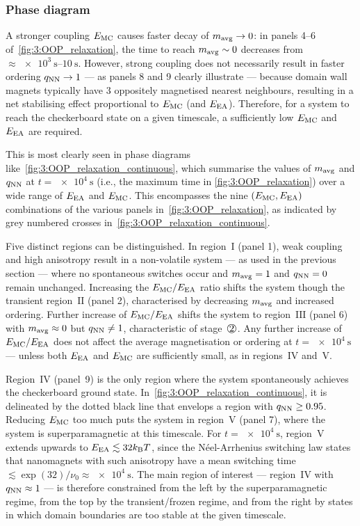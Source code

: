 \subsubsection{Phase diagram}
A stronger coupling $E_\mathrm{MC}$ causes faster decay of $m_\mathrm{avg} \rightarrow 0$: in panels 4--6 of~\cref{fig:3:OOP_relaxation}, the time to reach $m_\mathrm{avg} \sim 0$ decreases from $\approx \SIrange{e3}{10}{\second}$.
However, strong coupling does not necessarily result in faster ordering $q_\mathrm{NN} \rightarrow 1$ --- as panels 8 and 9 clearly illustrate --- because domain wall magnets typically have 3 oppositely magnetised nearest neighbours, resulting in a net stabilising effect proportional to $E_\mathrm{MC}$ (and $E_\mathrm{EA}$).
Therefore, for a system to reach the checkerboard state on a given timescale, a sufficiently low $E_\mathrm{MC}$ and $E_\mathrm{EA}$ are required. \par
This is most clearly seen in phase diagrams like~\cref{fig:3:OOP_relaxation_continuous}, which summarise the values of $m_\mathrm{avg}$ and $q_\mathrm{NN}$ at $t = \SI{e4}{\second}$ (i.e., the maximum time in \cref{fig:3:OOP_relaxation}) over a wide range of $E_\mathrm{EA}$ and $E_\mathrm{MC}$.
This encompasses the nine $(E_\mathrm{MC},E_\mathrm{EA})$ combinations of the various panels in~\cref{fig:3:OOP_relaxation}, as indicated by grey numbered crosses in~\cref{fig:3:OOP_relaxation_continuous}. \par
Five distinct regions can be distinguished.
In region~$\mathrm{I}$ (panel 1), weak coupling and high anisotropy result in a non-volatile system --- as used in the previous section --- where no spontaneous switches occur and $m_\mathrm{avg} = 1$ and $q_\mathrm{NN} = 0$ remain unchanged.
Increasing the $E_\mathrm{MC}/E_\mathrm{EA}$ ratio shifts the system though the transient region~$\mathrm{II}$ (panel 2), characterised by decreasing $m_\mathrm{avg}$ and increased ordering.
Further increase of $E_\mathrm{MC}/E_\mathrm{EA}$ shifts the system to region~$\mathrm{III}$ (panel 6) with $m_\mathrm{avg} \approx 0$ but $q_\mathrm{NN} \neq 1$, characteristic of stage~$\circled{2}$.
Any further increase of $E_\mathrm{MC}/E_\mathrm{EA}$ does not affect the average magnetisation or ordering at $t = \SI{e4}{\second}$ --- unless both $E_\mathrm{EA}$ and $E_\mathrm{MC}$ are sufficiently small, as in regions~$\mathrm{IV}$ and~$\mathrm{V}$. \par
Region~$\mathrm{IV}$ (panel~9) is the only region where the system spontaneously achieves the checkerboard ground state.
In~\cref{fig:3:OOP_relaxation_continuous}, it is delineated by the dotted black line that envelops a region with $q_\mathrm{NN} \geq 0.95$.
Reducing $E_\mathrm{MC}$ too much puts the system in region~$\mathrm{V}$ (panel 7), where the system is superparamagnetic at this timescale.
For $t = \SI{e4}{\second}$, region~$\mathrm{V}$ extends upwards to $\EEA \lesssim 32 \kBT$, since the N\'eel-Arrhenius switching law states that nanomagnets with such anisotropy have a mean switching time $\lesssim \exp(32)/\nu_0 \approx \SI{e4}{\second}$.
The main region of interest --- region~$\mathrm{IV}$ with $q_\mathrm{NN} \approx 1$ --- is therefore constrained from the left by the superparamagnetic regime, from the top by the transient/frozen regime, and from the right by states in which domain boundaries are too stable at the given timescale. \par


